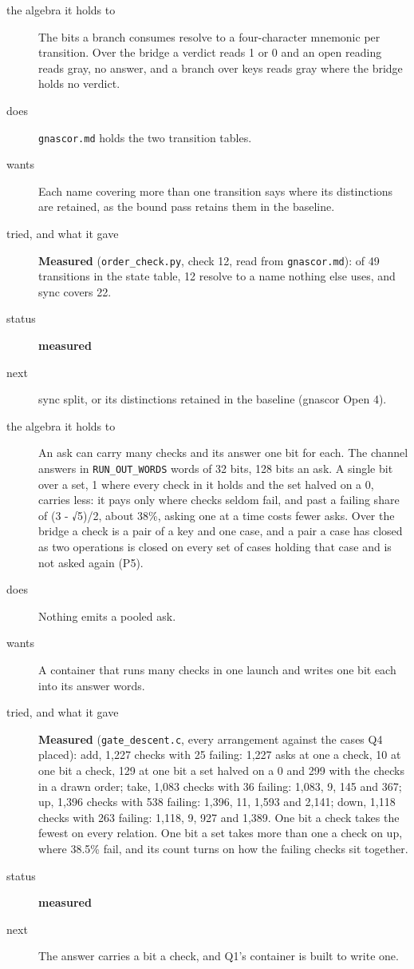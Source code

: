 \begin{description}
\item[{the algebra it holds to}] The bits a branch consumes resolve to a four-character mnemonic per transition. Over the bridge a verdict reads 1 or 0 and an open reading reads gray, no answer, and a branch over keys reads gray where the bridge holds no verdict.
\item[{does}] \texttt{gnascor.\allowbreak{}md} holds the two transition tables.
\item[{wants}] Each name covering more than one transition says where its distinctions are retained, as the bound pass retains them in the baseline.
\item[{tried, and what it gave}] \textbf{Measured} (\texttt{order\_\allowbreak{}check.\allowbreak{}py}, check 12, read from \texttt{gnascor.\allowbreak{}md}): of 49 transitions in the state table, 12 resolve to a name nothing else uses, and sync covers 22.
\item[{status}] \textbf{measured}
\item[{next}] sync split, or its distinctions retained in the baseline (gnascor Open 4).
\end{description}

\begin{description}
\item[{the algebra it holds to}] An ask can carry many checks and its answer one bit for each. The channel answers in \texttt{RUN\_\allowbreak{}OUT\_\allowbreak{}WORDS} words of 32 bits, 128 bits an ask. A single bit over a set, 1 where every check in it holds and the set halved on a 0, carries less: it pays only where checks seldom fail, and past a failing share of (3 - √5)/2, about 38\%, asking one at a time costs fewer asks. Over the bridge a check is a pair of a key and one case, and a pair a case has closed as two operations is closed on every set of cases holding that case and is not asked again (P5).
\item[{does}] Nothing emits a pooled ask.
\item[{wants}] A container that runs many checks in one launch and writes one bit each into its answer words.
\item[{tried, and what it gave}] \textbf{Measured} (\texttt{gate\_\allowbreak{}descent.\allowbreak{}c}, every arrangement against the cases Q4 placed): add, 1,227 checks with 25 failing: 1,227 asks at one a check, 10 at one bit a check, 129 at one bit a set halved on a 0 and 299 with the checks in a drawn order; take, 1,083 checks with 36 failing: 1,083, 9, 145 and 367; up, 1,396 checks with 538 failing: 1,396, 11, 1,593 and 2,141; down, 1,118 checks with 263 failing: 1,118, 9, 927 and 1,389. One bit a check takes the fewest on every relation. One bit a set takes more than one a check on up, where 38.5\% fail, and its count turns on how the failing checks sit together.
\item[{status}] \textbf{measured}
\item[{next}] The answer carries a bit a check, and Q1's container is built to write one.
\end{description}


